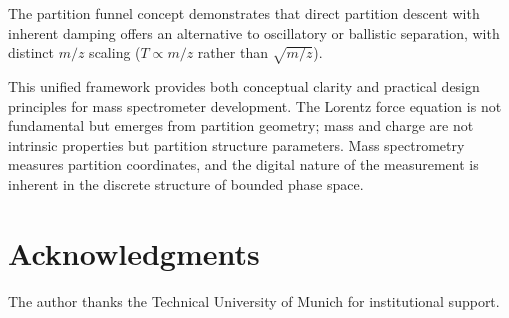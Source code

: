 \documentclass[twocolumn,10pt,a4paper]{article}
\theoremstyle{definition}
\theoremstyle{remark}
\begin{document}
The partition funnel concept demonstrates that direct partition descent with inherent damping offers an alternative to oscillatory or ballistic separation, with distinct $m/z$ scaling ($T \propto m/z$ rather than $\sqrt{m/z}$).

This unified framework provides both conceptual clarity and practical design principles for mass spectrometer development. The Lorentz force equation is not fundamental but emerges from partition geometry; mass and charge are not intrinsic properties but partition structure parameters. Mass spectrometry measures partition coordinates, and the digital nature of the measurement is inherent in the discrete structure of bounded phase space.


\section*{Acknowledgments}

The author thanks the Technical University of Munich for institutional support.




\end{document}
